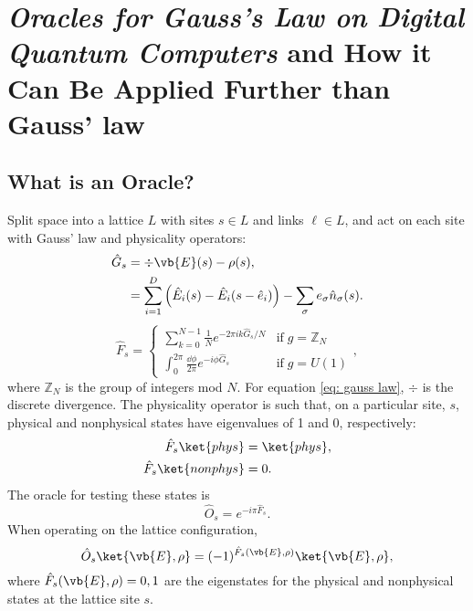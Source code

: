 \documentclass[
a4paper,
10pt,
twoside,
prd,
aps,
nofootinbib,
superscriptaddress,
floatfix,
preprintnumbers,
twocolumn
]{revtex4}
\begin{document}
\titleinf
\maketitle
\startmcols

\section{\textit{Oracles for Gauss’s Law on Digital Quantum Computers} and How it Can Be Applied Further than Gauss' law}

\subsection{What is an Oracle?}
Split space into a lattice $L$ with sites $s \in L$ and links $\ell \in L$, and act on each site with Gauss' law and physicality operators\cite{osti_1609314}:
\begin{align}
	\hat{G}_s &= \div{\vb{E}}(s) - \rho(s),\label{eq: gauss law}\\
	&= \sum_{i=1}^D \left( \hat{E}_i(s)-\hat{E}_i(s-\hat{e}_i)\right)-\sum_{\sigma}e_\sigma \hat{n}_\sigma(s).\label{eq: Gs law}
\end{align}
\begin{equation}
	\hat{F}_s = \left\{
		\begin{array}{ll}
			\sum_{k=0}^{N-1} \frac{1}{N} e^{-2\pi i k \hat{G}_s/N} & \text{if}\; g=\mathbb{Z}_N \\
			\int_{0}^{2\pi} \frac{\dd{\phi}}{2\pi} e^{-i\phi \hat{G}_s} & \text{if}\; g=U(1)
		\end{array}
	\right.,
	\label{eq: Fs}
\end{equation}
where $\mathbb{Z}_N$ is the group of integers mod $N$.
For equation \ref{eq: gauss law}, $\div$ is the discrete divergence.
The physicality operator is such that, on a particular site, $s$, physical and nonphysical states have eigenvalues of 1 and 0, respectively\cite{osti_1609314}:
\begin{align}
	\hat{F}_s \ket{phys} &= \ket{phys},\\
	\hat{F}_s \ket{nonphys} &= 0.
\end{align}
The oracle for testing these states is
\begin{equation}
	\hat{O}_s = e^{-i\pi \hat{F}_s}.
\end{equation}
When operating on the lattice configuration,
\begin{equation}
	\hat{O}_s \ket{\vb{E},\rho} = (-1)^{\hat{F}_s(\vb{E},\rho)}\ket{\vb{E},\rho},
\end{equation}
where $\hat{F}_s(\vb{E},\rho) = 0,1$ are the eigenstates for the physical and nonphysical states at the lattice site $s$.
\end{document}
